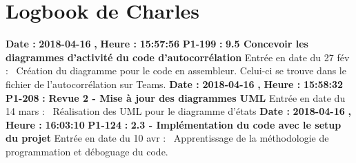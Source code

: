 \documentclass{article}%
\begin{document}
%
\section{Logbook de Charles}%
\textbf{Date : }%
\textbf{2018{-}04{-}16}%
\textbf{,}%
\textbf{ Heure : }%
\textbf{15:57:56}%
\newline%
%
\textbf{P1{-}199 }%
\textbf{ : }%
\textbf{ 9.5 Concevoir les diagrammes d'activité du code d'autocorrélation}%
\newline%
\newline%
%
Entrée en date du 27 fév :~\newline%
Création du diagramme pour le code en assembleur. Celui{-}ci se trouve dans le fichier de l'autocorrélation sur Teams.\newline%
\newline%
%
\textbf{Date : }%
\textbf{2018{-}04{-}16}%
\textbf{,}%
\textbf{ Heure : }%
\textbf{15:58:32}%
\newline%
%
\textbf{P1{-}208 }%
\textbf{ : }%
\textbf{ Revue 2 {-} Mise à jour des diagrammes UML}%
\newline%
\newline%
%
Entrée en date du 14 mars :~\newline%
Réalisation des UML pour le diagramme d'états\newline%
\newline%
%
\textbf{Date : }%
\textbf{2018{-}04{-}16}%
\textbf{,}%
\textbf{ Heure : }%
\textbf{16:03:10}%
\newline%
%
\textbf{P1{-}124 }%
\textbf{ : }%
\textbf{ 2.3 {-} Implémentation du code avec le setup du projet}%
\newline%
\newline%
%
Entrée en date du 10 avr :~\newline%
Apprentissage de la méthodologie de programmation et déboguage du code.\newline%
\newline%
%
\newpage

%
\end{document}
